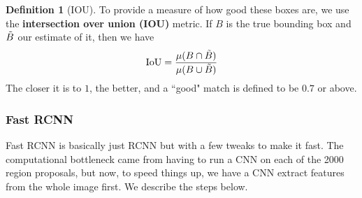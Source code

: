 \documentclass{article}
\theoremstyle{definition}
\theoremstyle{remark}
\theoremstyle{definition}
\newtheorem{definition}{Definition}[section]
\begin{document}
\begin{definition}[IOU]
To provide a measure of how good these boxes are, we use the \textbf{intersection over union (IOU)} metric. If $B$ is the true bounding box and $\Tilde{B}$ our estimate of it, then we have 
\[\mathrm{IoU} = \frac{\mu(B \cap \Tilde{B})}{\mu(B \cup \Tilde{B})}\]
The closer it is to $1$, the better, and a ``good" match is defined to be $0.7$ or above.  
\end{definition} 


\subsubsection{Fast RCNN}

Fast RCNN is basically just RCNN but with a few tweaks to make it fast. The computational bottleneck came from having to run a CNN on each of the 2000 region proposals, but now, to speed things up, we have a CNN extract features from the whole image first. We describe the steps below. 
\end{document}
